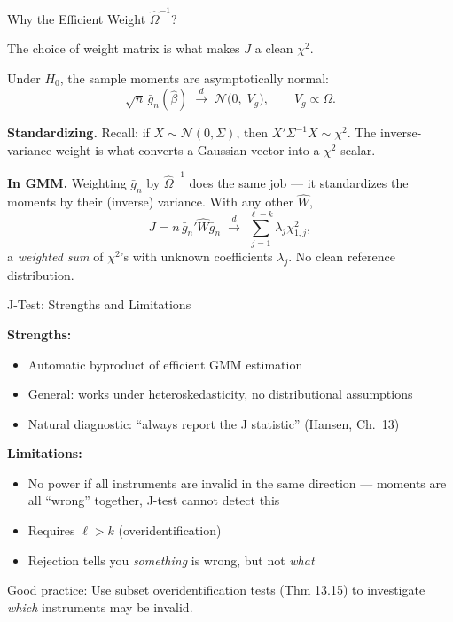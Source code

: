 \documentclass[aspectratio=169, handout]{beamer}
\numberwithin{equation}{section}
\begin{document}
\begin{frame}{Why the Efficient Weight $\hat\Omega^{-1}$?}

The choice of weight matrix is what makes $J$ a clean $\chi^2$.

\medskip
Under $H_0$, the sample moments are asymptotically normal:
$$\sqrt{n}\,\bar g_n(\hat\beta) \;\xrightarrow{d}\; \mathcal N\!\bigl(0,\;V_g\bigr), \qquad V_g \propto \Omega.$$

\medskip
\textbf{Standardizing.} Recall: if $X \sim \mathcal N(0,\Sigma)$, then $X'\Sigma^{-1}X \sim \chi^2$. The inverse-variance weight is what converts a Gaussian vector into a $\chi^2$ scalar.

\medskip
\textbf{In GMM.} Weighting $\bar g_n$ by $\hat\Omega^{-1}$ does the same job --- it standardizes the moments by their (inverse) variance. With any other $\hat W$,
$$J = n\,\bar g_n' \hat W \bar g_n \;\xrightarrow{d}\; \sum_{j=1}^{\ell-k} \lambda_j \chi^2_{1,j},$$
a \textit{weighted sum} of $\chi^2$'s with unknown coefficients $\lambda_j$. No clean reference distribution.

\end{frame}

\begin{frame}{J-Test: Strengths and Limitations}

\textbf{Strengths:}
\begin{itemize}
\item Automatic byproduct of efficient GMM estimation
\item General: works under heteroskedasticity, no distributional assumptions
\item Natural diagnostic: ``always report the J statistic'' (Hansen, Ch.~13)
\end{itemize}

\medskip
\textbf{Limitations:}
\begin{itemize}
\item \alert{No power if all instruments are invalid in the same direction} --- moments are all ``wrong'' together, J-test cannot detect this
\item Requires $\ell > k$ (overidentification)
\item Rejection tells you \textit{something} is wrong, but not \textit{what}
\end{itemize}

\smallskip
\alert{Good practice:} Use subset overidentification tests (Thm 13.15) to investigate \textit{which} instruments may be invalid.

\end{frame}
\end{document}

